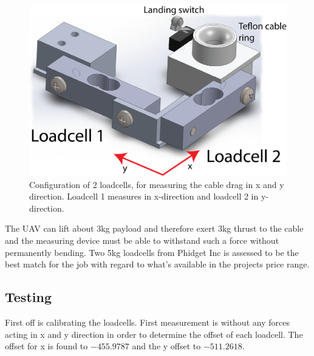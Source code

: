 \begin{figure}[H]
\centering
\includegraphics[scale=0.75]{graphics/cad/loadcell.png}
\caption[Configuration of 2 loadcells, for measuring the cable drag]{Configuration of 2 loadcells, for measuring the cable drag in x and y direction. Loadcell 1 measures in x-direction and loadcell 2 in y-direction.}
\label{fig:loadcells}
\end{figure}

\noindent
The UAV can lift about 3kg payload and therefore exert 3kg thrust to the cable and the measuring device must be able to withstand such a force without permanently bending. Two 5kg loadcells from Phidget Inc is assessed to be the best match for the job with regard to what's available in the projects price range.

\subsection{Testing}
First off is calibrating the loadcells. First measurement is without any forces acting in x and y direction in order to determine the offset of each loadcell.
The offset for x is found to $-455.9787$ and the y offset to $-511.2618$.\\

